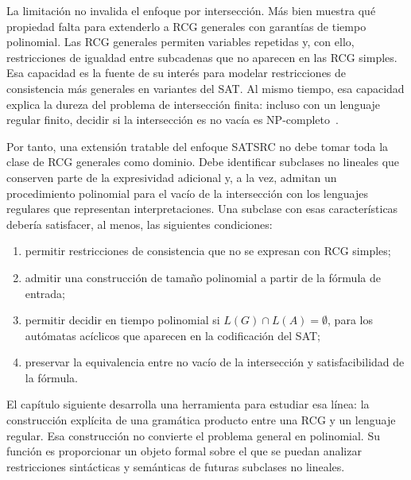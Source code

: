 \documentclass{report}
\theoremstyle{definition}
\theoremstyle{plain}
\theoremstyle{remark}
\begin{document}
La limitación no invalida el enfoque por intersección. Más bien muestra
qué propiedad falta para extenderlo a RCG generales con garantías de
tiempo polinomial. Las RCG generales permiten variables repetidas y, con
ello, restricciones de igualdad entre subcadenas que no aparecen en las
RCG simples. Esa capacidad es la fuente de su interés para modelar
restricciones de consistencia más generales en variantes del SAT. Al
mismo tiempo, esa capacidad explica la dureza del problema de
intersección finita: incluso con un lenguaje regular finito, decidir si
la intersección es no vacía es NP-completo~\cite{bertsch2001rcg}.

Por tanto, una extensión tratable del enfoque SATSRC no debe tomar toda
la clase de RCG generales como dominio. Debe identificar subclases no
lineales que conserven parte de la expresividad adicional y, a la vez,
admitan un procedimiento polinomial para el vacío de la intersección con
los lenguajes regulares que representan interpretaciones. Una subclase
con esas características debería satisfacer, al menos, las siguientes
condiciones:
\begin{enumerate}
  \item permitir restricciones de consistencia que no se expresan con
  RCG simples;
  \item admitir una construcción de tamaño polinomial a partir de la
  fórmula de entrada;
  \item permitir decidir en tiempo polinomial si
  $L(G) \cap L(A)=\emptyset$, para los autómatas acíclicos que aparecen
  en la codificación del SAT;
  \item preservar la equivalencia entre no vacío de la intersección y
  satisfacibilidad de la fórmula.
\end{enumerate}

El capítulo siguiente desarrolla una herramienta para estudiar esa línea:
la construcción explícita de una gramática producto entre una RCG y un
lenguaje regular. Esa construcción no convierte el problema general en
polinomial. Su función es proporcionar un objeto formal sobre el que se
puedan analizar restricciones sintácticas y semánticas de futuras
subclases no lineales.




\end{document}
